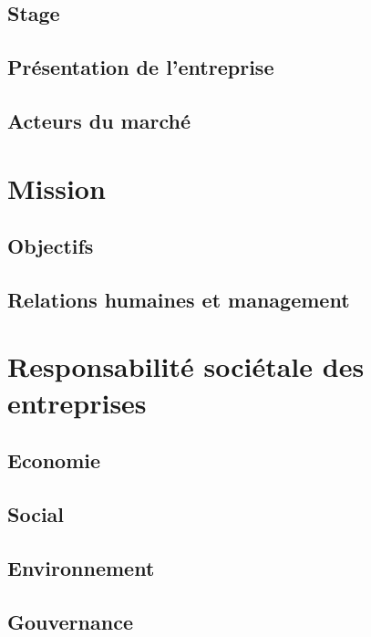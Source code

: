 \documentclass[12pt, oneside, a4paper, titlepage]{report}
\begin{document}
\section{Stage}%
\label{sec:intro-stage}

\section{Présentation de l'entreprise}%
\label{sec:intro-entreprise}

\section{Acteurs du marché}%
\label{sec:intro-acteurs}

\chapter{Mission}%
\label{cha:mission}

\section{Objectifs}%
\label{sec:mission-objectifs}

\section{Relations humaines et management}%
\label{sec:mission-rhm}

\chapter{Responsabilité sociétale des entreprises}%
\label{cha:rse}

\section{Economie}%
\label{sec:rse-eco}

\section{Social}%
\label{sec:rse-social}

\section{Environnement}%
\label{sec:rse-env}

\section{Gouvernance}%
\label{sec:rse-gouv}
\end{document}
